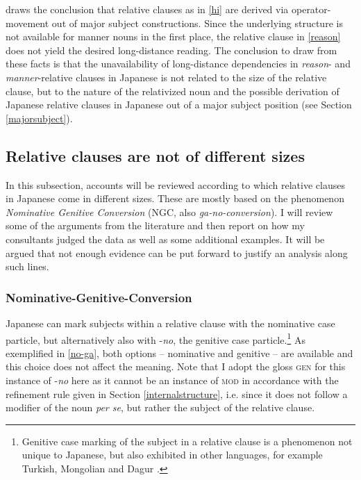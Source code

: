 \citet{miyamoto:2017:RC} draws the conclusion that relative clauses as in \ref{hi} are derived via operator-movement out of major subject constructions. Since the underlying structure is not available for manner nouns in the first place, the relative clause in \ref{reason} does not yield the desired long-distance reading. The conclusion to draw from these facts is that the unavailability of long-distance dependencies in \textit{reason}- and \textit{manner}-relative clauses in Japanese is not related to the size of the relative clause, but to the nature of the relativized noun and the possible derivation of Japanese relative clauses in Japanese out of a major subject position (see Section \ref{majorsubject}).

\subsection{Relative clauses are not of different sizes} \label{NGC}

In this subsection, accounts will be reviewed according to which relative clauses in Japanese come in different sizes. These are mostly based on the phenomenon \textit{Nominative Genitive Conversion} (NGC, also \textit{ga-no-conversion}). I will review some of the arguments from the literature and then report on how my consultants judged the data as well as some additional examples. It will be argued that not enough evidence can be put forward to justify an analysis along such lines.

\subsubsection{Nominative-Genitive-Conversion}

Japanese can mark subjects within a relative clause with the nominative case particle, but alternatively also with -\textit{no}, the genitive case particle.\footnote{Genitive case marking of the subject in a relative clause is a phenomenon not unique to Japanese, but also exhibited in other languages, for example Turkish, Mongolian and Dagur \citep{krause:2001:rrc}.} As exemplified in \ref{no-ga}, both options -- nominative and genitive -- are available and this choice does not affect the meaning. Note that I adopt the gloss \textsc{gen} for this instance of -\textit{no} here as it cannot be an instance of \textsc{mod} in accordance with the refinement rule given in Section \ref{internalstructure}, i.e. since it does not follow a modifier of the noun \textit{per se}, but rather the subject of the relative clause.  

